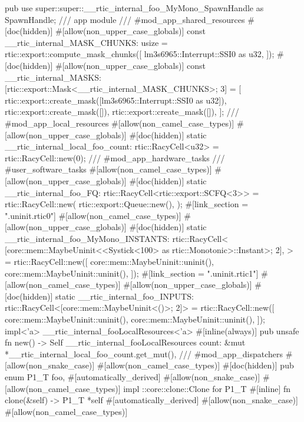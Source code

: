 {{{            pub use super::super::__rtic_internal_foo_MyMono_SpawnHandle as SpawnHandle;
        }
    }
    /// app module
    /// #mod_app_shared_resources
    #[doc(hidden)]
    #[allow(non_upper_case_globals)]
    const __rtic_internal_MASK_CHUNKS: usize = rtic::export::compute_mask_chunks([
        lm3s6965::Interrupt::SSI0 as u32,
    ]);
    #[doc(hidden)]
    #[allow(non_upper_case_globals)]
    const __rtic_internal_MASKS: [rtic::export::Mask<__rtic_internal_MASK_CHUNKS>; 3] = [
        rtic::export::create_mask([lm3s6965::Interrupt::SSI0 as u32]),
        rtic::export::create_mask([]),
        rtic::export::create_mask([]),
    ];
    /// #mod_app_local_resources
    #[allow(non_camel_case_types)]
    #[allow(non_upper_case_globals)]
    #[doc(hidden)]
    static __rtic_internal_local_foo_count: rtic::RacyCell<u32> = rtic::RacyCell::new(0);
    /// #mod_app_hardware_tasks
    /// #user_software_tasks
    #[allow(non_camel_case_types)]
    #[allow(non_upper_case_globals)]
    #[doc(hidden)]
    static __rtic_internal_foo_FQ: rtic::RacyCell<rtic::export::SCFQ<3>> = rtic::RacyCell::new(
        rtic::export::Queue::new(),
    );
    #[link_section = ".uninit.rtic0"]
    #[allow(non_camel_case_types)]
    #[allow(non_upper_case_globals)]
    #[doc(hidden)]
    static __rtic_internal_foo_MyMono_INSTANTS: rtic::RacyCell<
        [core::mem::MaybeUninit<<Systick<100> as rtic::Monotonic>::Instant>; 2],
    > = rtic::RacyCell::new([
        core::mem::MaybeUninit::uninit(),
        core::mem::MaybeUninit::uninit(),
    ]);
    #[link_section = ".uninit.rtic1"]
    #[allow(non_camel_case_types)]
    #[allow(non_upper_case_globals)]
    #[doc(hidden)]
    static __rtic_internal_foo_INPUTS: rtic::RacyCell<[core::mem::MaybeUninit<()>; 2]> = rtic::RacyCell::new([
        core::mem::MaybeUninit::uninit(),
        core::mem::MaybeUninit::uninit(),
    ]);
    impl<'a> __rtic_internal_fooLocalResources<'a> {
        #[inline(always)]
        pub unsafe fn new() -> Self {
            __rtic_internal_fooLocalResources {
                count: &mut *__rtic_internal_local_foo_count.get_mut(),
            }
        }
    }
    /// #mod_app_dispatchers
    #[allow(non_snake_case)]
    #[allow(non_camel_case_types)]
    #[doc(hidden)]
    pub enum P1_T {
        foo,
    }
    #[automatically_derived]
    #[allow(non_snake_case)]
    #[allow(non_camel_case_types)]
    impl ::core::clone::Clone for P1_T {
        #[inline]
        fn clone(&self) -> P1_T {
            *self
        }
    }
    #[automatically_derived]
    #[allow(non_snake_case)]
    #[allow(non_camel_case_types)]
}
